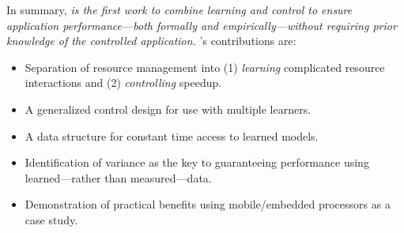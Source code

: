 In summary, \emph{\SYSTEM{} is the first work to combine learning and
  control to ensure application performance---both formally and
  empirically---without requiring prior knowledge of the controlled
  application.}  \SYSTEM{}'s contributions are:
\begin{itemize}[leftmargin=1em]
\item Separation of resource management into (1) \emph{learning}
  complicated resource interactions and (2) \emph{controlling}
  speedup.
\item A generalized control design for use with multiple learners.
\item A data structure for constant time access to learned models.
\item Identification of variance as the key to guaranteeing
  performance using learned---rather than measured---data.
\item Demonstration of practical benefits using mobile/embedded
  processors as a case study.
\end{itemize}




